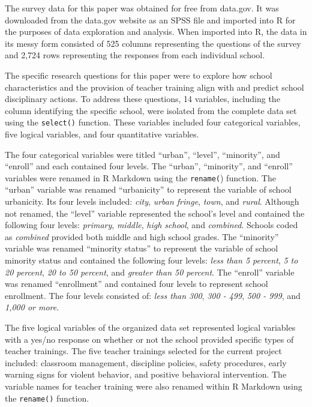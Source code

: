 \documentclass[
  man, fleqn, noextraspace]{apa6}
\begin{document}
The survey data for this paper was obtained for free from data.gov. It was downloaded from the data.gov website as an SPSS file and imported into R for the purposes of data exploration and analysis. When imported into R, the data in its messy form consisted of 525 columns representing the questions of the survey and 2,724 rows representing the responses from each individual school.

The specific research questions for this paper were to explore how school characteristics and the provision of teacher training align with and predict school disciplinary actions. To address these questions, 14 variables, including the column identifying the specific school, were isolated from the complete data set using the \texttt{select()} function. These variables included four categorical variables, five logical variables, and four quantitative variables.

The four categorical variables were titled \enquote{urban}, \enquote{level}, \enquote{minority}, and \enquote{enroll} and each contained four levels. The \enquote{urban}, \enquote{minority}, and \enquote{enroll} variables were renamed in R Markdown using the \texttt{rename(}) function. The \enquote{urban} variable was renamed \enquote{urbanicity} to represent the variable of school urbanicity. Its four levels included: \emph{city}, \emph{urban fringe}, \emph{town}, and \emph{rural}. Although not renamed, the \enquote{level} variable represented the school's level and contained the following four levels: \emph{primary}, \emph{middle}, \emph{high school}, and \emph{combined}. Schools coded as \emph{combined} provided both middle and high school grades. The \enquote{minority} variable was renamed \enquote{minority status} to represent the variable of school minority status and contained the following four levels: \emph{less than 5 percent}, \emph{5 to 20 percent}, \emph{20 to 50 percent}, and \emph{greater than 50 percent}. The \enquote{enroll} variable was renamed \enquote{enrollment} and contained four levels to represent school enrollment. The four levels consisted of: \emph{less than 300}, \emph{300 - 499}, \emph{500 - 999}, and \emph{1,000 or more}.

The five logical variables of the organized data set represented logical variables with a yes/no response on whether or not the school provided specific types of teacher trainings. The five teacher trainings selected for the current project included: classroom management, discipline policies, safety procedures, early warning signs for violent behavior, and positive behavioral intervention. The variable names for teacher training were also renamed within R Markdown using the \texttt{rename()} function.
\end{document}
